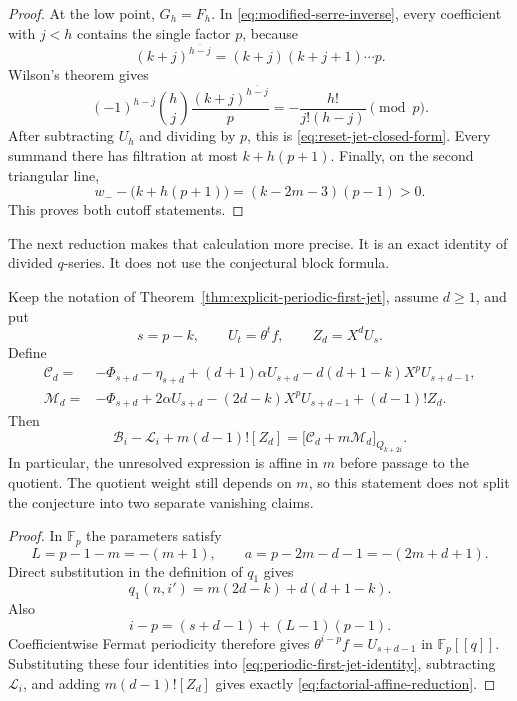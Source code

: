 \begin{proof}
At the low point, $G_h=F_h$.  In
\eqref{eq:modified-serre-inverse}, every coefficient with $j<h$ contains
the single factor $p$, because
\[
 (k+j)^{\overline{h-j}}=(k+j)(k+j+1)\cdots p.
\]
Wilson's theorem gives
\[
 (-1)^{h-j}\binom hj
 \frac{(k+j)^{\overline{h-j}}}{p}
 =-\frac{h!}{j!(h-j)}\pmod p.
\]
After subtracting $U_h$ and dividing by $p$, this is
\eqref{eq:reset-jet-closed-form}.  Every summand there has filtration at
most $k+h(p+1)$.  Finally, on the second triangular line,
\[
 w_--\bigl(k+h(p+1)\bigr)=(k-2m-3)(p-1)>0.
\]
This proves both cutoff statements.
\end{proof}

The next reduction makes that calculation more precise.  It is an exact
identity of divided $q$-series.  It does not use the conjectural block
formula.

\begin{proposition}
\label{prop:factorial-affine-reduction}
Keep the notation of Theorem~\ref{thm:explicit-periodic-first-jet}, assume
$d\geq1$, and put
\[
 s=p-k,\qquad U_t=\theta^t f,\qquad Z_d=X^dU_s.
\]
Define
\begin{align*}
 \mathcal C_d={}&-\Phi_{s+d}-\eta_{s+d}
 +(d+1)\alpha U_{s+d}
 -d(d+1-k)X^pU_{s+d-1},\\
 \mathcal M_d={}&-\Phi_{s+d}+2\alpha U_{s+d}
 -(2d-k)X^pU_{s+d-1}+(d-1)!Z_d.
\end{align*}
Then
\begin{equation}
\label{eq:factorial-affine-reduction}
 \mathcal B_i-\mathcal L_i+m(d-1)![Z_d]
 =\bigl[\mathcal C_d+m\mathcal M_d\bigr]_{Q_{k+2i}}.
\end{equation}
In particular, the unresolved expression is affine in $m$ before passage
to the quotient.  The quotient weight still depends on $m$, so this
statement does not split the conjecture into two separate vanishing
claims.
\end{proposition}

\begin{proof}
In $\mathbb F_p$ the parameters satisfy
\[
 L=p-1-m=-(m+1),\qquad
 a=p-2m-d-1=-(2m+d+1).
\]
Direct substitution in the definition of $q_1$ gives
\[
 q_1(n,i')=m(2d-k)+d(d+1-k).
\]
Also
\[
 i-p=(s+d-1)+(L-1)(p-1).
\]
Coefficientwise Fermat periodicity therefore gives
$\theta^{i-p}f=U_{s+d-1}$ in $\mathbb F_p[[q]]$.  Substituting these four
identities into \eqref{eq:periodic-first-jet-identity}, subtracting
$\mathcal L_i$, and adding $m(d-1)![Z_d]$ gives exactly
\eqref{eq:factorial-affine-reduction}.
\end{proof}

